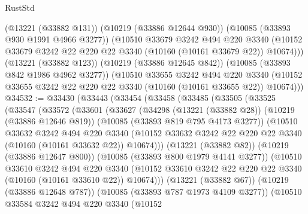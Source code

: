\begin{lexlean}{RustStd}
\begin{coremodule}
        (@13221 (@33882 @131))
        (@10219 (@33886 @12644 @930))
        (@10085 (@33893 @930 @1991 @4966 @3277))
        (@10510
          @33679
          @3242
          @494
          @220
          @3340
          (@10152 @33679 @3242 @22 @220 @22 @3340 (@10160 (@10161 @33679 @22)) @10674)))
      (@13221 (@33882 @123))
      (@10219 (@33886 @12645 @842))
      (@10085 (@33893 @842 @1986 @4962 @3277))
      (@10510
        @33655
        @3242
        @494
        @220
        @3340
        (@10152 @33655 @3242 @22 @220 @22 @3340 (@10160 (@10161 @33655 @22)) @10674)))
@34532 := @33430
    (@33443
      (@33454
        (@33458
          (@33485
            (@33505
              (@33525
                (@33547
                  (@33572
                    (@33601
                      (@33627
                        (@34298
                          (@13221 (@33882 @28))
                          (@10219 (@33886 @12646 @819))
                          (@10085 (@33893 @819 @795 @4173 @3277))
                          (@10510
                            @33632
                            @3242
                            @494
                            @220
                            @3340
                            (@10152
                              @33632
                              @3242
                              @22
                              @220
                              @22
                              @3340
                              (@10160 (@10161 @33632 @22))
                              @10674)))
                        (@13221 (@33882 @82))
                        (@10219 (@33886 @12647 @800))
                        (@10085 (@33893 @800 @1979 @4141 @3277))
                        (@10510
                          @33610
                          @3242
                          @494
                          @220
                          @3340
                          (@10152
                            @33610
                            @3242
                            @22
                            @220
                            @22
                            @3340
                            (@10160 (@10161 @33610 @22))
                            @10674)))
                      (@13221 (@33882 @67))
                      (@10219 (@33886 @12648 @787))
                      (@10085 (@33893 @787 @1973 @4109 @3277))
                      (@10510
                        @33584
                        @3242
                        @494
                        @220
                        @3340
                        (@10152

\end{coremodule}
\end{lexlean}
